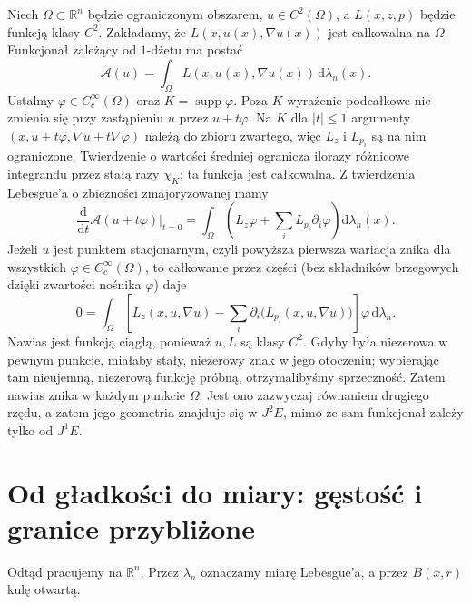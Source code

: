 \begin{przyklad}
Niech $\Omega\subset\mathbb R^n$ będzie ograniczonym obszarem,
$u\in C^2(\Omega)$, a $L(x,z,p)$ będzie funkcją klasy $C^2$.
Zakładamy, że $L(x,u(x),\nabla u(x))$ jest całkowalna na $\Omega$.
Funkcjonał zależący od $1$-dżetu ma postać
\[
 \mathcal A(u)=\int_\Omega L(x,u(x),\nabla u(x))
 \,\mathrm d\lambda_n(x).
\]
Ustalmy $\varphi\in C_c^\infty(\Omega)$ oraz
$K=\operatorname{supp}\varphi$. Poza $K$ wyrażenie
podcałkowe nie zmienia się przy zastąpieniu $u$
przez $u+t\varphi$. Na $K$ dla $|t|\le1$ argumenty
$(x,u+t\varphi,\nabla u+t\nabla\varphi)$ należą
do zbioru zwartego, więc $L_z$ i $L_{p_i}$ są
na nim ograniczone. Twierdzenie o wartości średniej
ogranicza ilorazy różnicowe integrandu przez stałą
razy $\chi_K$; ta funkcja jest całkowalna.
Z twierdzenia Lebesgue'a o zbieżności zmajoryzowanej mamy
\[
 \frac{\mathrm d}{\mathrm dt}\mathcal A(u+t\varphi)\big|_{t=0}
 =\int_\Omega\left(L_z\varphi+
 \sum_i L_{p_i}\partial_i\varphi\right)\mathrm d\lambda_n(x).
\]
Jeżeli $u$ jest punktem stacjonarnym, czyli powyższa
pierwsza wariacja znika dla wszystkich
$\varphi\in C_c^\infty(\Omega)$, to całkowanie
przez części (bez składników brzegowych dzięki
zwartości nośnika $\varphi$) daje
\[
 0=\int_\Omega\left[L_z(x,u,\nabla u)-
 \sum_i\partial_i\big(L_{p_i}(x,u,\nabla u)\big)\right]
 \varphi\,\mathrm d\lambda_n .
\]
Nawias jest funkcją ciągłą, ponieważ $u,L$ są
klasy $C^2$. Gdyby była niezerowa w pewnym punkcie,
miałaby stały, niezerowy znak w jego otoczeniu;
wybierając tam nieujemną, niezerową funkcję próbną,
otrzymalibyśmy sprzeczność. Zatem nawias znika
w każdym punkcie $\Omega$.
Jest ono zazwyczaj równaniem drugiego rzędu, a zatem
jego geometria znajduje się w $J^2E$, mimo że
sam funkcjonał zależy tylko od $J^1E$.
\end{przyklad}

\section{Od gładkości do miary: gęstość i granice przybliżone}
Odtąd pracujemy na $\mathbb R^n$. Przez $\lambda_n$ oznaczamy
miarę Lebesgue'a, a przez $B(x,r)$ kulę otwartą.


